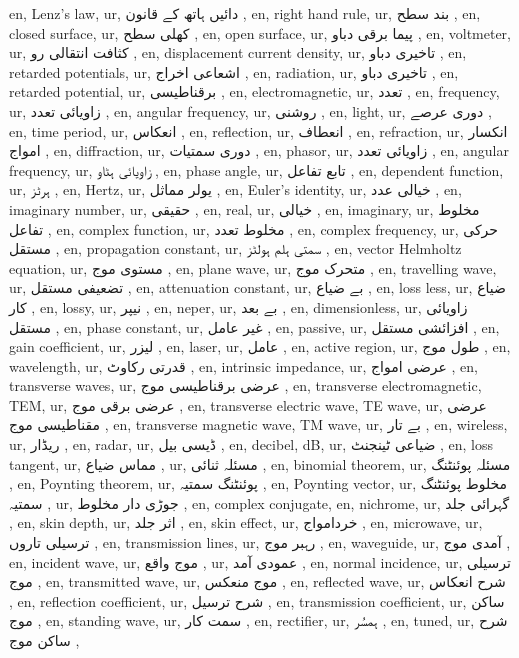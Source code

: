 en, Lenz's law,
ur, دائیں ہاتھ کے قانون ,
en, right hand rule,
ur, بند سطح ,
en, closed surface,
ur, کھلی سطح ,
en, open surface,
ur, پیما برقی دباو ,
en, voltmeter,
ur, کثافت انتقالی رو ,
en, displacement current density,
ur, تاخیری دباو ,
en, retarded potentials,
ur, اشعاعی اخراج ,
en, radiation,
ur, تاخیری دباو ,
en, retarded potential,
ur, برقناطیسی ,
en, electromagnetic,
ur, تعدد ,
en, frequency,
ur, زاویائی تعدد ,
en, angular frequency,
ur, روشنی ,
en, light,
ur, دوری عرصے ,
en, time period,
ur, انعکاس ,
en, reflection,
ur, انعطاف ,
en, refraction,
ur, انکسار امواج ,
en, diffraction,
ur, دوری سمتیات ,
en, phasor,
ur, زاویائی تعدد ,
en, angular frequency,
ur, زاویائی ہٹاو ,
en, phase angle,
ur, تابع تفاعل ,
en, dependent function,
ur, ہرٹز ,
en, Hertz,
ur, یولر مماثل ,
en, Euler's identity,
ur, خیالی عدد ,
en, imaginary number,
ur, حقیقی ,
en, real,
ur, خیالی ,
en, imaginary,
ur, مخلوط تفاعل ,
en, complex function,
ur, مخلوط تعدد ,
en, complex frequency,
ur, حرکی مستقل ,
en, propagation constant,
ur, سمتی ہلم ہولٹز ,
en, vector Helmholtz equation,
ur, مستوی موج ,
en, plane wave,
ur, متحرک موج ,
en, travelling wave,
ur, تضعیفی مستقل ,
en, attenuation constant,
ur, بے ضیاع ,
en, loss less,
ur, ضیاع کار ,
en, lossy,
ur, نیپر ,
en, neper,
ur, بے بعد ,
en, dimensionless,
ur, زاویائی مستقل ,
en, phase constant,
ur, غیر عامل ,
en, passive,
ur, افزائشی مستقل ,
en, gain coefficient,
ur, لیزر ,
en, laser,
ur, عامل ,
en, active region,
ur, طول موج ,
en, wavelength,
ur, قدرتی رکاوٹ ,
en, intrinsic impedance,
ur, عرضی امواج ,
en, transverse waves,
ur, عرضی برقناطیسی موج ,
en, transverse electromagnetic, TEM,
ur, عرضی برقی موج ,
en, transverse electric wave, TE wave,
ur, عرضی مقناطیسی موج ,
en, transverse magnetic wave, TM wave,
ur, بے تار ,
en, wireless,
ur, ریڈار ,
en, radar,
ur, ڈیسی بیل ,
en, decibel, dB,
ur, ضیاعی ٹینجنٹ ,
en, loss tangent,
ur, مماس ضیاع ,
ur, مسئلہ ثنائی ,
en, binomial theorem,
ur, مسئلہ پوئنٹنگ ,
en, Poynting theorem,
ur, پوئنٹنگ سمتیہ ,
en, Poynting vector,
ur, مخلوط پوئنٹنگ سمتیہ ,
ur, جوڑی دار مخلوط ,
en, complex conjugate,
en, nichrome,
ur, گہرائی جلد ,
en, skin depth,
ur, اثر جلد ,
en, skin effect,
ur, خردامواج ,
en, microwave,
ur, ترسیلی تاروں ,
en, transmission lines,
ur, رہبر موج ,
en, waveguide,
ur, آمدی موج ,
en, incident wave,
ur, موج واقع ,
ur, عمودی آمد ,
en, normal incidence,
ur, ترسیلی موج ,
en, transmitted wave,
ur, موج منعکس ,
en, reflected wave,
ur, شرح انعکاس ,
en, reflection coefficient,
ur, شرح ترسیل ,
en, transmission coefficient,
ur, ساکن موج ,
en, standing wave,
ur, سمت کار ,
en, rectifier,
ur, ہمسُر ,
en, tuned,
ur, شرح ساکن موج ,
